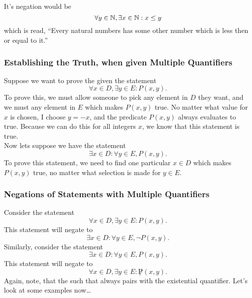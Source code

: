 \documentclass{report}
\begin{document}
\noindent It's negation would be
$$
	\forall y\in\mathbb{N}, \exists x\in\mathbb{N}: x\leq y
$$
which is read, ``Every natural numbers has some other number which is less then or equal to it.''

\subsubsection*{Establishing the Truth, when given Multiple Quantifiers}
Suppose we want to prove the given the statement
$$
	\forall x\in D, \exists y\in E: P(x,y).
$$
To prove this, we must allow someone to pick any element in $D$ they want, and we must any element in $E$ which makes $P(x,y)$ true.
\noindent No matter what value for $x$ is chosen, I choose $y=-x$, and the predicate $P(x,y)$ always evaluates to true. Because we can do this for all integers $x$, we know that this statement is true.\\

\noindent Now lets suppose we have the statement
$$
	\exists x\in D: \forall y\in E, P(x,y).
$$
To prove this statement, we need to find one particular $x\in D$ which makes $P(x,y)$ true, no matter what selection is made for $y\in E$.

\subsubsection*{Negations of Statements with Multiple Quantifiers}
Consider the statement
$$
	\forall x\in D, \exists y\in E: P(x,y).
$$
This statement will negate to
$$
	\exists x\in D:\forall y\in E, \lnot P(x,y).
$$
Similarly, consider the statement
$$
	\exists x\in D: \forall y\in E, P(x,y).
$$
This statement will negate to
$$
	\forall x\in D, \exists y\in E: \not P(x,y).
$$
Again, note, that the such that always pairs with the existential quantifier. Let's look at some examples now\dots
{}
\end{document}

